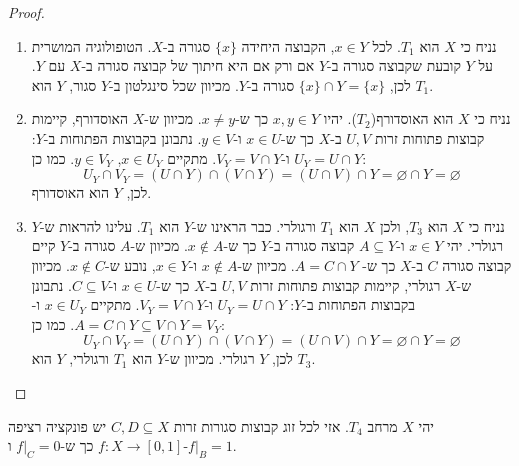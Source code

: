 \documentclass{tstextbook}
\begin{document}
\begin{proof}
  \begin{enumerate}
    \item נניח כי \(X\) הוא \(T_1\). לכל \(x \in Y\), הקבוצה היחידה \(\{x\}\) סגורה ב-\(X\). הטופולוגיה המושרית על \(Y\) קובעת שקבוצה סגורה ב-\(Y\) אם ורק אם היא חיתוך של קבוצה סגורה ב-\(X\) עם \(Y\). לכן, \(\{x\} \cap Y = \{x\}\) סגורה ב-\(Y\). מכיוון שכל סינגלטון ב-\(Y\) סגור, \(Y\) הוא \(T_1\). 


    \item נניח כי \(X\) הוא האוסדורף(\(T_{2}\)). יהיו \(x, y \in Y\) כך ש-\(x \neq y\). מכיוון ש-\(X\) האוסדורף, קיימות קבוצות פתוחות זרות \(U, V\) ב-\(X\) כך ש-\(x \in U\) ו-\(y \in V\). נתבונן בקבוצות הפתוחות ב-\(Y\): \(U_Y = U \cap Y\) ו-\(V_Y = V \cap Y\). מתקיים \(x \in U_Y\), \(y \in V_Y\). כמו כן: 
$$U_Y \cap V_Y = \left( U \cap Y \right) \cap \left( V \cap Y \right) = \left( U \cap V \right) \cap Y = \varnothing  \cap Y = \varnothing $$
לכן, \(Y\) הוא האוסדורף.


    \item נניח כי \(X\) הוא \(T_3\), ולכן \(X\) הוא \(T_1\) ורגולרי. כבר הראינו ש-\(Y\) הוא \(T_1\). עלינו להראות ש-\(Y\) רגולרי. יהי \(x \in Y\) ו-\(A \subseteq Y\) קבוצה סגורה ב-\(Y\) כך ש-\(x \notin A\). מכיוון ש-\(A\) סגורה ב-\(Y\) קיים קבוצה סגורה \(C\) ב-\(X\) כך ש- \(A = C \cap Y\). מכיוון ש-\(x \notin A\) ו-\(x \in Y\), נובע ש-\(x \notin C\). מכיוון ש-\(X\) רגולרי, קיימות קבוצות פתוחות זרות \(U, V\) ב-\(X\) כך ש-\(x \in U\) ו-\(C \subseteq V\). נתבונן בקבוצות הפתוחות ב-\(Y\): \(U_Y = U \cap Y\) ו-\(V_Y = V \cap Y\). מתקיים \(x \in U_Y\) ו-\(A = C \cap Y \subseteq V \cap Y = V_Y\). כמו כן: 
$$U_Y \cap V_Y = \left( U \cap Y \right) \cap \left( V \cap Y \right) = \left( U \cap V \right) \cap Y = \varnothing  \cap Y = \varnothing $$
לכן, \(Y\) רגולרי. מכיוון ש-\(Y\) הוא \(T_1\) ורגולרי, \(Y\) הוא \(T_3\).


  \end{enumerate}
\end{proof}
\begin{proposition}
יהי \(X\) מרחב \(T_{4}\). אזי לכל זוג קבוצות סגורות זרות \(C,D\subseteq X\) יש פונקציה רציפה \(f:X\to[0,1]\) כך ש-\(f|_{C}=0\) ו-\(f|_{B}=1\).

\end{proposition}
\end{document}
